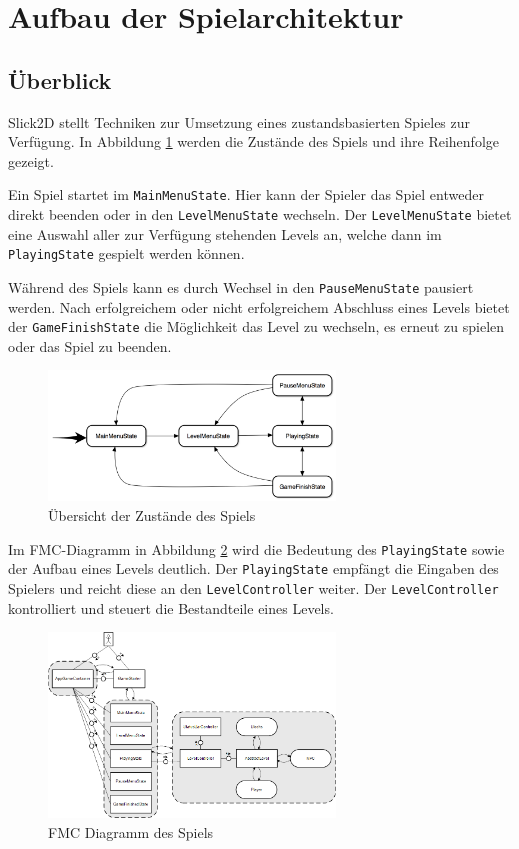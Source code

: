 \section{Aufbau der Spielarchitektur}
\label{sec:architektur}

\subsection{Überblick}
\label{sub:architektur:ueberblick}

Slick2D stellt Techniken zur Umsetzung eines zustandsbasierten Spieles zur Verfügung.
In Abbildung \ref{fig:spielarchitektur:states} werden die Zustände des Spiels und ihre Reihenfolge gezeigt.

Ein Spiel startet im \texttt{MainMenuState}.
Hier kann der Spieler das Spiel entweder direkt beenden oder in den \texttt{LevelMenuState} wechseln.
Der \texttt{LevelMenuState} bietet eine Auswahl aller zur Verfügung stehenden Levels an, welche dann im \texttt{PlayingState} gespielt werden können.

Während des Spiels kann es durch Wechsel in den \texttt{PauseMenuState} pausiert werden.
Nach erfolgreichem oder nicht erfolgreichem Abschluss eines Levels bietet der \texttt{GameFinishState} die Möglichkeit das Level zu wechseln, es erneut zu spielen oder das Spiel zu beenden.

\begin{figure}[]
\centering
\includegraphics[width=3in]{img/05_states.png}
\caption{Übersicht der Zustände des Spiels}
\label{fig:spielarchitektur:states}
\end{figure}

Im FMC-Diagramm in Abbildung \ref{fig:spielarchitektur:fmc} wird die Bedeutung des \texttt{PlayingState} sowie der Aufbau eines Levels deutlich.
Der \texttt{PlayingState} empfängt die Eingaben des Spielers und reicht diese an den \texttt{LevelController} weiter.
Der \texttt{LevelController} kontrolliert und steuert die Bestandteile eines Levels.

\begin{figure}[]
\centering
\includegraphics[width=3in]{img/05_fmc.png}
\caption{FMC Diagramm des Spiels}
\label{fig:spielarchitektur:fmc}
\end{figure}

